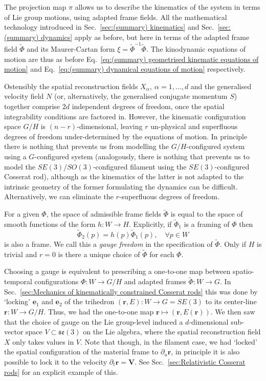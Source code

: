 The projection map $\pi$ allows us to describe the kinematics of the system in terms of Lie group motions, using adapted frame fields. All the mathematical technology introduced in Sec.~\ref{sec:(summary) kinematics} and Sec.~\ref{sec:(summary) dynamics} apply as before, but here in terms of the adapted frame field $\tilde{\Phi}$ and its Maurer-Cartan form $\xi = \tilde{\Phi}^{-1} \tilde{\Phi}$. The kinodynamic equations of motion are thus as before Eq.~\ref{eq:(summary) geometrised kinematic equations of motion} and Eq.~\ref{eq:(summary) dynamical equations of motion} respectively.

Ostensibly the spatial reconstruction fields $X_\alpha,\ \alpha=1,\dots, d$ and the generalised velocity field $N$ (or, alternatively, the generalised conjugate momentum $S$) together comprise $2d$ independent degrees of freedom, once the spatial integrability conditions are factored in. However, the kinematic configuration space $G/H$ is $(n-r)$-dimensional, leaving $r$ un-physical and superfluous degrees of freedom under-determined by the equations of motion. In principle there is nothing that prevents us from modelling the $G/H$-configured system using a $G$-configured system (analogously, there is nothing that prevents us to model the $SE(3)/SO(3)$-configured filament using the $SE(3)$-configured Cosserat rod), although as the kinematics of the latter is not adapted to the intrinsic geometry of the former formulating the dynamics can be difficult. Alternatively, we can eliminate the $r$-superfluous degrees of freedom.

For a given $\Phi$, the space of admissible frame fields $\tilde{\Phi}$ is equal to the space of smooth functions of the form $h : W \to H$. Explicitly, if $\tilde{\Phi}_1$ is a framing of $\Phi$ then
\begin{equation}
\tilde{\Phi}_2(p) = h(p) \tilde{\Phi}_1(p), \quad \forall p \in W
\end{equation}
is also a frame. We call this a \textit{gauge freedom} in the specification of $\tilde{\Phi}$. Only if $H$ is trivial and $r=0$ is there a unique choice of $\tilde{\Phi}$ for each $\Phi$.

Choosing a gauge is equivalent to prescribing a one-to-one map between spatio-temporal configurations $\Phi : W \to G/H$ and adapted frames $\tilde{\Phi} : W \to G$. In Sec.~\ref{sec:Mechanics of kinematically constrained Cosserat rods} this was done by `locking' $\mathbf{e}_1$ and $\mathbf{e}_2$ of the trihedron $(\mathbf{r}, E) : W \to G = SE(3)$ to its center-line $\mathbf{r} : W \to G/H$. Thus, we had the one-to-one map $\mathbf{r} \mapsto (\mathbf{r}, E(\mathbf{r}) )$. We then saw that the choice of gauge on the Lie group-level induced a $d$-dimensional sub-vector space $V \subset \mathfrak{se}(3)$ on the Lie algebra, where the spatial reconstruction field $X$ only takes values in $V$. Note that though, in the filament case, we had `locked' the spatial configuration of the material frame to $\partial_u \mathbf{r}$, in principle it is also possible to lock it to the velocity $\partial_t \mathbf{r} = \mathbf{V}$. See Sec.~\ref{sec:Relativistic Cosserat rods} for an explicit example of this.

